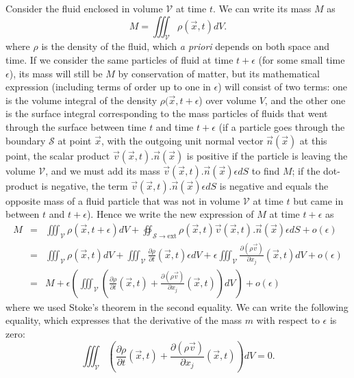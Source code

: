 \documentclass[DIV=12]{article}
\newcommand{\sExt}{{{\mathcal{S}}\rightarrow{\mathrm{ext}}}}
\begin{document}
Consider the fluid enclosed in volume $\mathcal{V}$ at time $t$. We can write 
 its mass $M$ as 
\begin{equation}
M = \iiint_{\mathcal{V}} \rho( \vec{x}, t ) dV.
\end{equation}
 where $\rho$ is the density of the fluid, which {\emph{a priori}} depends on both
 space and time. If we consider the same particles of fluid at time $t+\epsilon$ (for some 
 small time $\epsilon$), its mass will still be $M$ by conservation of matter,
 but its mathematical expression (including terms of order up to one in $\epsilon$) will consist of two terms:
 one is the volume integral of the density $\rho(\vec{x}, t+\epsilon$) over volume $V$,
 and the other one is the surface integral corresponding to the mass particles of fluids
 that went through the surface between time $t$ and time $t+\epsilon$ (if a particle goes through the
 boundary $\mathcal{S}$ at point $\vec{x}$, with the outgoing unit normal vector $\vec{n}( \vec{x})$ at this point, 
 the scalar product $\vec{v}(\vec{x}, t).\vec{n}(\vec{x})$ is positive if the particle is leaving the volume $\mathcal{V}$, and we must 
 add its mass $\vec{v}(\vec{x}, t).\vec{n}(\vec{x}) \epsilon dS$ to find $M$; if the dot-product is negative, the 
  term $\vec{v}(\vec{x}, t).\vec{n}(\vec{x}) \epsilon dS$ is negative and equals the opposite  mass of a fluid particle that was not in volume
 $\mathcal{V}$ at time $t$ but came in between $t$ and $t+\epsilon$). Hence we write the new expression of $M$ at time $t+\epsilon$ as 
\[
\begin{array}{lll}
M &= & \iiint_{\mathcal{V}} \rho( \vec{x}, t+\epsilon ) dV + \oiint_\sExt \rho (\vec{x}, t)\vec{v}(\vec{x}, t).\vec{n}(\vec{x}) \epsilon dS + o(\epsilon)\\
    &  = & \iiint_{\mathcal{V}} \rho( \vec{x}, t) dV + \iiint_{\mathcal{V}} \frac{\partial\rho}{\partial t}( \vec{x}, t) \epsilon dV +
                 \epsilon\iiint_{\mathcal{V}}\frac{\partial (\rho\vec{v})}{\partial x_j}(\vec{x},t) dV + o(\epsilon)\\
   & = & M +  \epsilon\left( \iiint_{\mathcal{V}}\left( \frac{\partial\rho}{\partial t}( \vec{x}, t)+ \frac{\partial (\rho\vec{v})}{\partial x_j}(\vec{x},t)\right) dV\right) + o(\epsilon)
 \end{array}
\label{massAfter}
\]
where we used Stoke's theorem in the second equality. We can write the following equality, which expresses that the derivative of the 
 mass $m$ with respect to $\epsilon$ is zero:  
\begin{equation}
\iiint_{\mathcal{V}}\left( \frac{\partial\rho}{\partial t}( \vec{x}, t)+ \frac{\partial (\rho\vec{v})}{\partial x_j}(\vec{x},t)\right) dV = 0.
\label{massConsGlobal}
\end{equation}
\end{document}
